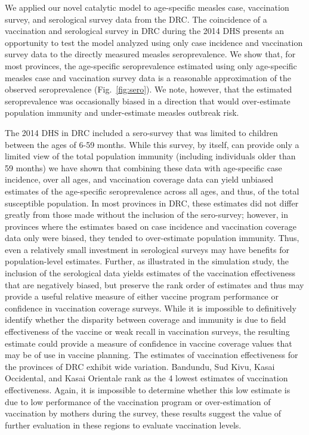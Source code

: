 \documentclass[nofootinbib,aps,pre,twocolumn,superscriptaddress,showkeys,showpacs]{revtex4-1}
\begin{document}
We applied our novel catalytic model to age-specific measles case, vaccination survey, and serological survey data from the DRC. The coincidence of a vaccination and serological survey in DRC during the 2014 DHS presents an opportunity to test the model analyzed using only case incidence and vaccination survey data to the directly measured measles seroprevalence. We show that, for most provinces, the age-specific seroprevalence estimated using only age-specific measles case and vaccination survey data is a reasonable approximation of the observed seroprevalence (Fig.~\ref{fig:sero}). We note, however, that the estimated seroprevalence was occasionally biased in a direction that would over-estimate population immunity and under-estimate measles outbreak risk.

The 2014 DHS in DRC included a sero-survey that was limited to children between the ages of 6-59 months. While this survey, by itself, can provide only a limited view of the total population immunity (including individuals older than 59 months) we have shown that combining these data with age-specific case incidence, over all ages, and vaccination coverage data can yield unbiased estimates of the age-specific seroprevalence across all ages, and thus, of the total susceptible population. In most provinces in DRC, these estimates did not differ greatly from those made without the inclusion of the sero-survey; however, in provinces where the estimates based on case incidence and vaccination coverage data only were biased, they tended to over-estimate population immunity.  Thus, even a relatively small investment in serological surveys may have benefits for population-level estimates.  Further, as illustrated in the simulation study, the inclusion of the serological data yields estimates of the vaccination effectiveness that are negatively biased, but preserve the rank order of estimates and thus may provide a useful relative measure of either vaccine program performance or confidence in vaccination coverage surveys.  While it is impossible to definitively identify whether the disparity between coverage and immunity is due to field effectiveness of the vaccine or weak recall in vaccination surveys, the resulting estimate could provide a measure of confidence in vaccine coverage values that may be of use in vaccine planning. The estimates of vaccination effectiveness for the provinces of DRC exhibit wide variation. Bandundu, Sud Kivu, Kasai Occidental, and Kasai Orientale rank as the 4 lowest estimates of vaccination effectiveness.  Again, it is impossible to determine whether this low estimate is due to low performance of the vaccination program or over-estimation of vaccination by mothers during the survey, these results suggest the value of further evaluation in these regions to evaluate vaccination levels. 
\end{document}
